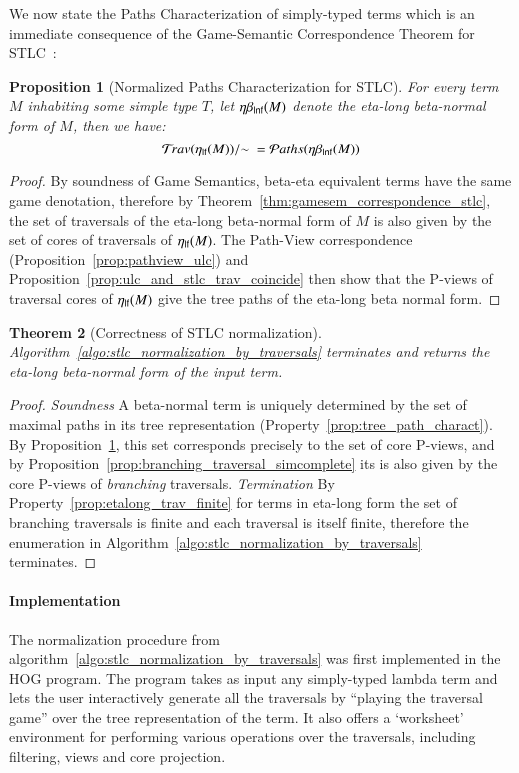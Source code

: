 \documentclass{elsarticle}
\theoremstyle{plain}
\newtheorem{theorem}{Theorem}[section]
\newtheorem{proposition}[theorem]{Proposition}
\theoremstyle{definition}
\theoremstyle{remark}
\newcommand{\travulc}{\travset}
\newcommand\pathset{{\mathcal{P}aths}} %
\begin{document}
We now state the Paths Characterization of simply-typed terms which is an immediate consequence of the Game-Semantic Correspondence Theorem for STLC~\cite{BlumPhd}:
\begin{proposition}[Normalized Paths Characterization for STLC]
\label{prop:path_charact_stlc}
For every term $M$ inhabiting some simple type $T$, let $\eta\beta_{\sf lnf}(M)$ denote the eta-long beta-normal form of $M$, then we have:
\begin{equation*}
\travulc(\etalf{M})/{\sim}\ = \pathset(\etabetalnf{M})
\end{equation*}
\end{proposition}
\begin{proof}
 By soundness of Game Semantics, beta-eta equivalent terms have the same game denotation, therefore by Theorem~\ref{thm:gamesem_correspondence_stlc}, the set of traversals of the eta-long beta-normal form of $M$ is also given by the set of cores of traversals of $\eta_{\sf lf}(M)$. The Path-View correspondence (Proposition~\ref{prop:pathview_ulc}) and Proposition~\ref{prop:ulc_and_stlc_trav_coincide} then show that the P-views of traversal cores of $\eta_{\sf lf}(M)$ give the tree paths of the eta-long beta normal form.
\end{proof}



\begin{theorem}[Correctness of STLC normalization]
Algorithm~\ref{algo:stlc_normalization_by_traversals} terminates and returns the eta-long beta-normal form of the input term.
\end{theorem}
\begin{proof}
\emph{Soundness} A beta-normal term is uniquely determined by the set of maximal paths in its tree representation (Property~\ref{prop:tree_path_charact}). By Proposition~\ref{prop:path_charact_stlc}, this set corresponds precisely to the set of core P-views,
and by Proposition~\ref{prop:branching_traversal_simcomplete} its is also given by the core P-views of \emph{branching} traversals.
\emph{Termination} By Property~\ref{prop:etalong_trav_finite} for terms in eta-long form the set of branching traversals is finite and each traversal is itself finite, therefore the enumeration in Algorithm~\ref{algo:stlc_normalization_by_traversals} terminates.
\end{proof}


\paragraph{Implementation} The normalization procedure from algorithm~\ref{algo:stlc_normalization_by_traversals} was first implemented in the HOG program\cite{BlumGalop2008, BlumPhd,BlumHogTool2008}. The program takes as input any simply-typed lambda term and lets the user interactively generate all the traversals by ``playing the traversal game'' over the tree representation of the term. It also offers a `worksheet' environment for performing various operations over the traversals, including filtering, views and core projection.
\end{document}
